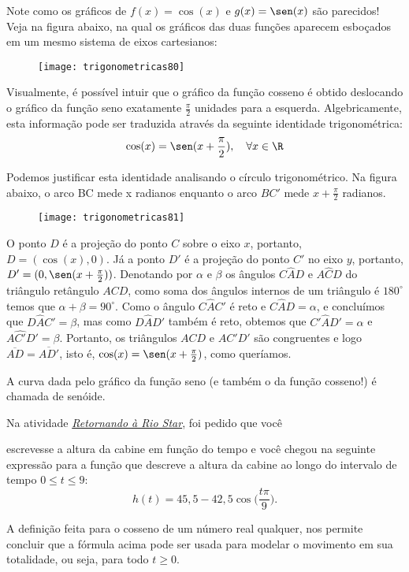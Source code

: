 Note como os gráficos de $f(x) = \cos(x)$ e $g(x) = \sen(x)$ são parecidos! Veja na figura abaixo, na qual os gráficos das duas funções aparecem esboçados em um mesmo sistema de eixos cartesianos:

\begin{figure}[H]
\centering

\texttt{[image: trigonometricas80]}
\end{figure}

Visualmente, é possível intuir que o gráfico da função cosseno é obtido deslocando o gráfico da função seno exatamente $\frac{\pi}{2}$ unidades para a esquerda. Algebricamente, esta informação pode ser traduzida através da seguinte identidade trigonométrica:
\begin{equation*}
\cos(x)=\sen(x+\frac{\pi}{2}),\quad\forall x\in\R
\end{equation*}

Podemos justificar esta identidade analisando o círculo trigonométrico. Na figura abaixo, o arco BC mede x radianos enquanto o arco $BC'$ mede $x + \frac{\pi}{2}$ radianos. 

\begin{figure}[H]
\centering

\texttt{[image: trigonometricas81]}
\end{figure}

O ponto $D$ é a projeção do ponto $C$ sobre o eixo $x$, portanto, $D = (\cos(x), 0)$. Já a ponto $D'$ é a projeção do ponto $C'$ no eixo $y$, portanto, $D' = (0,\sen(x +  \frac{\pi}{2}))$. Denotando por $\alpha$ e $\beta$ os ângulos $C\hat{A}D$ e $A\hat{C}D$ do triângulo retângulo $ACD$, como soma dos ângulos internos de um triângulo é $180^{\circ}$ temos que $\alpha+\beta=90^{\circ}$. Como o ângulo $C\hat{A}C'$ é reto e $C\hat{A}D=\alpha$, e concluímos que $D\hat{A}C'=\beta$, mas como $D\hat{A}D'$ também é reto, obtemos que $C'\hat{A}D'=\alpha$ e $A\hat{C'}D'=\beta$. Portanto, os triângulos $ACD$ e $AC'D'$ são congruentes e logo $\overline{AD}=\overline{AD'}$, isto é, $\cos(x) = \sen(x +  \frac{\pi}{2})$, como queríamos.


A curva dada pelo gráfico da função seno (e também o da função cosseno!) é chamada de senóide. 


\begin{observation}{}
Na atividade \hyperref[trig-ativ15]{\textit{Retornando à Rio Star}}, foi pedido que você


escrevesse a altura da cabine em função do tempo e você chegou na seguinte expressão para a função que descreve a altura da cabine ao longo do intervalo de tempo $0\leq t\leq 9$:
\begin{equation*}
h(t)=45{,}5-42{,}5\cos\bigg(\frac{t\pi}{9}\bigg).
\end{equation*}

A definição feita para o cosseno de um número real qualquer, nos permite concluir que a fórmula acima pode ser usada para modelar o movimento em sua totalidade, ou seja, para todo $t\geq0$.

\end{observation}

